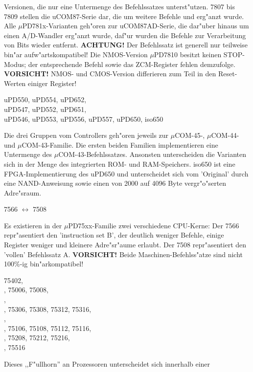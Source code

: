 \documentclass[12pt,a4paper,twoside]{report}
\newcommand{\bb}[1]{{\bf #1}}
\begin{document}
Versionen, die nur eine Untermenge des Befehlssatzes unterst"utzen.  7807
bis 7809 stellen die uCOM87-Serie dar, die um weitere Befehle und erg"anzt
wurde.  Alle $\mu$PD781x-Varianten geh"oren zur uCOM87AD-Serie, die dar"uber
hinaus um einen A/D-Wandler erg"anzt wurde, daf"ur wurden die Befehle zur
Verarbeitung von Bits wieder entfernt.  \bb{ACHTUNG!} Der Befehlssatz ist
generell nur teilweise bin"ar aufw"artskompatibel!  Die NMOS-Version
$\mu$PD7810 besitzt keinen STOP-Modus; der entsprechende Befehl sowie das
ZCM-Register fehlen demzufolge.  \bb{VORSICHT!} NMOS- und CMOS-Version
differieren zum Teil in den Reset-Werten einiger Register!
\begin{cpulist}
   uPD550, uPD554, uPD652, \\
\> uPD547, uPD552, uPD651, \\
\> uPD546, uPD553, uPD556, uPD557, uPD650, iso650
\end{cpulist}
Die drei Gruppen vom Controllers geh"oren jeweils zur
$\mu$COM-45-, $\mu$COM-44- und $\mu$COM-43-Familie. Die
ersten beiden Familien implementieren eine Untermenge
des $\mu$COM-43-Befehlssatzes.  Ansonsten unterscheiden
die Varianten sich in der Menge des integrierten ROM-
und RAM-Speichers.  iso650 ist eine FPGA-Implementierung
des uPD650 und unterscheidet sich vom 'Original' durch
eine NAND-Anweisung sowie einen von 2000 auf 4096 Byte
vergr"o"serten Adre"sraum.
\begin{cpulist}
   7566 $\leftrightarrow$ 7508
\end{cpulist}
Es existieren in der $\mu$PD75xx-Familie zwei verschiedene
CPU-Kerne: Der 7566 repr"asentiert den 'instruction set B', der
deutlich weniger Befehle, einige Register weniger und kleinere
Adre"sr"aume erlaubt.  Der 7508 repr"asentiert den 'vollen'
Befehlssatz A.  {\bf VORSICHT!} Beide Maschinen-Befehlss"atze
sind nicht 100\%-ig bin"arkompatibel!
\begin{cpulist}
   75402, \\
, 75006, 75008, \\
, \\
, 75306, 75308, 75312, 75316, \\
, \\
, 75106, 75108, 75112, 75116, \\
, 75208, 75212, 75216, \\
, 75516
\end{cpulist}
Dieses ,,F"ullhorn'' an Prozessoren unterscheidet sich innerhalb einer
\end{document}
